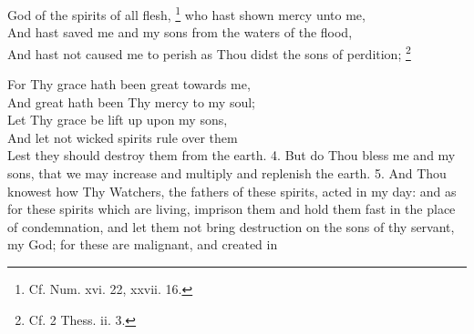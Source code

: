 God of the spirits of all flesh, \footnote{Cf. Num. xvi. 22, xxvii. 16.} who hast shown mercy unto me,\\
And hast saved me and my sons from the waters of the flood,\\
And hast not caused me to perish as Thou didst the sons of perdition; \footnote{Cf. 2 Thess. ii. 3.}

For Thy grace hath been great towards me,\\
And great hath been Thy mercy to my soul;\\
Let Thy grace be lift up upon my sons,\\
And let not wicked spirits rule over them\\
Lest they should destroy them from the earth. 4. But do Thou bless me and my sons, that we may increase and multiply and replenish the earth. 5. And Thou knowest how Thy Watchers, the fathers of these spirits, acted in my day: and as for these spirits which are living, imprison them and hold them fast in the place of condemnation, and let them not bring destruction on the sons of thy servant, my God; for these are malignant, and created in

